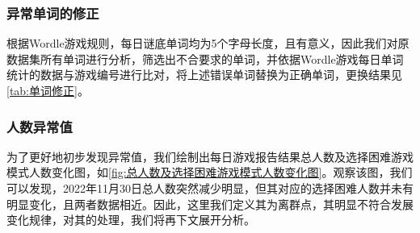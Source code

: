 \documentclass{MathModeling}
\begin{document}
	\subsubsection{异常单词的修正}
	根据Wordle游戏规则，每日谜底单词均为5个字母长度，且有意义，因此我们对原数据集所有单词进行分析，筛选出不合要求的单词，并依据Wordle游戏每日单词统计的数据与游戏编号进行比对，将上述错误单词替换为正确单词，更换结果见\textcolor{blue}{\cref{tab:单词修正}}。
\begin{table}[H]
	\centering
	\caption{单词修正}
	\label{tab:单词修正}
\end{table}
  
	\subsubsection{人数异常值}
	为了更好地初步发现异常值，我们绘制出每日游戏报告结果总人数及选择困难游戏模式人数变化图，如\textcolor{blue}{\cref{fig:总人数及选择困难游戏模式人数变化图}}。观察该图，我们可以发现，2022年11月30日总人数突然减少明显，但其对应的选择困难人数并未有明显变化，且两者数据相近。因此，这里我们定义其为离群点，其明显不符合发展变化规律，对其的处理，我们将再下文展开分析。
\end{document}
